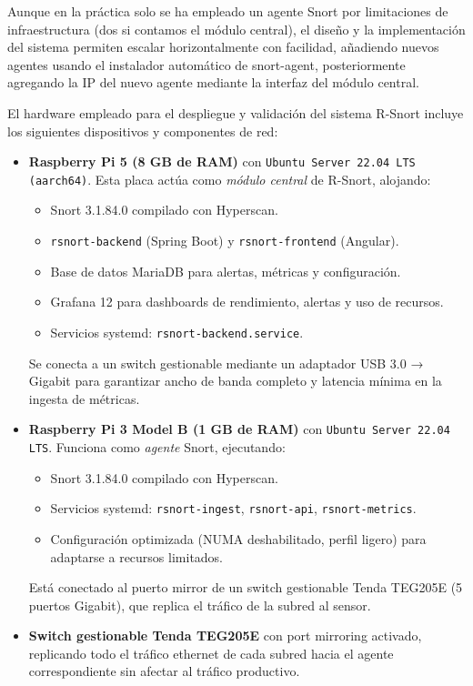 \documentclass[11pt,a4paper,twoside]{report}
\begin{document}
Aunque en la práctica solo se ha empleado un agente Snort por limitaciones de infraestructura (dos si contamos el módulo central), el diseño y la implementación del sistema permiten escalar horizontalmente con facilidad, añadiendo nuevos agentes usando el instalador automático de snort-agent, posteriormente agregando la IP del nuevo agente mediante la interfaz del módulo central.\newline

El hardware empleado para el despliegue y validación del sistema R-Snort incluye los siguientes dispositivos y componentes de red:

\begin{itemize}
	\item \textbf{Raspberry Pi 5 (8 GB de RAM)} con \texttt{Ubuntu Server 22.04 LTS (aarch64)}. Esta placa actúa como \emph{módulo central} de R-Snort, alojando:
	\begin{itemize}
		\item Snort 3.1.84.0 compilado con Hyperscan.
		\item \texttt{rsnort-backend} (Spring Boot) y \texttt{rsnort-frontend} (Angular).
		\item Base de datos MariaDB para alertas, métricas y configuración.
		\item Grafana 12 para dashboards de rendimiento, alertas y uso de recursos.
		\item Servicios systemd: \texttt{rsnort-backend.service}.
	\end{itemize}
	Se conecta a un switch gestionable mediante un adaptador USB 3.0 → Gigabit para garantizar ancho de banda completo y latencia mínima en la ingesta de métricas.
	
	\item \textbf{Raspberry Pi 3 Model B (1 GB de RAM)} con \texttt{Ubuntu Server 22.04 LTS}. Funciona como \emph{agente} Snort, ejecutando:
	\begin{itemize}
		\item Snort 3.1.84.0 compilado con Hyperscan.
		\item Servicios systemd: \texttt{rsnort-ingest}, \texttt{rsnort-api}, \texttt{rsnort-metrics}.
		\item Configuración optimizada (NUMA deshabilitado, perfil ligero) para adaptarse a recursos limitados.
	\end{itemize}
	Está conectado al puerto mirror de un switch gestionable Tenda TEG205E (5 puertos Gigabit), que replica el tráfico de la subred al sensor.
	
	\item \textbf{Switch gestionable Tenda TEG205E} con port mirroring activado, replicando todo el tráfico ethernet de cada subred hacia el agente correspondiente sin afectar al tráfico productivo.
	

\end{itemize}
\end{document}
